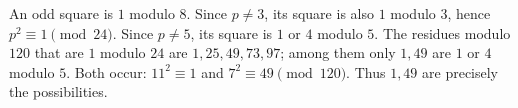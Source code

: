 An odd square is $1$ modulo $8$. Since $p\ne3$, its square is also $1$ modulo $3$, hence $p^2\equiv1\pmod{24}$. Since $p\ne5$, its square is $1$ or $4$ modulo $5$. The residues modulo $120$ that are $1$ modulo $24$ are $1,25,49,73,97$; among them only $1,49$ are $1$ or $4$ modulo $5$. Both occur: $11^2\equiv1$ and $7^2\equiv49\pmod{120}$. Thus $\boxed{1,49}$ are precisely the possibilities.
